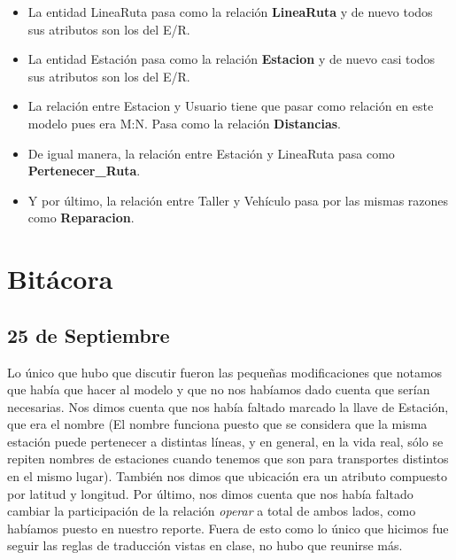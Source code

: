\documentclass[11pt]{article}
\begin{document}
\begin{itemize}
\item La entidad LineaRuta pasa como la relación \textbf{LineaRuta} y de nuevo todos sus atributos son los del E/R.
\item La entidad Estación pasa como la relación \textbf{Estacion} y de nuevo casi todos sus atributos son los del E/R.
\item La relación entre Estacion y Usuario tiene que pasar como relación en este modelo pues era M:N. Pasa como la relación \textbf{Distancias}. %
\item De igual manera, la relación entre Estación y LineaRuta pasa como \textbf{Pertenecer\_Ruta}. %
\item Y por último, la relación entre Taller y Vehículo pasa por las mismas razones como \textbf{Reparacion}. %
\end{itemize}
\pagebreak
\section*{Bitácora}

\subsection*{25 de Septiembre}

Lo único que hubo que discutir fueron las pequeñas modificaciones que notamos que había que hacer al modelo y que no nos habíamos dado cuenta que serían necesarias. Nos dimos cuenta que nos había faltado marcado la llave de Estación, que era el nombre (El nombre funciona puesto que se considera que la misma estación puede pertenecer a distintas líneas, y en general, en la vida real, sólo se repiten nombres de estaciones cuando tenemos que son para transportes distintos en el mismo lugar). También nos dimos que ubicación era un atributo compuesto por latitud y longitud. Por último, nos dimos cuenta que nos había faltado cambiar la participación de la relación \textit{operar} a total de ambos lados, como habíamos puesto en nuestro reporte. Fuera de esto como lo único que hicimos fue seguir las reglas de traducción vistas en clase, no hubo que reunirse más. 
\end{document}
